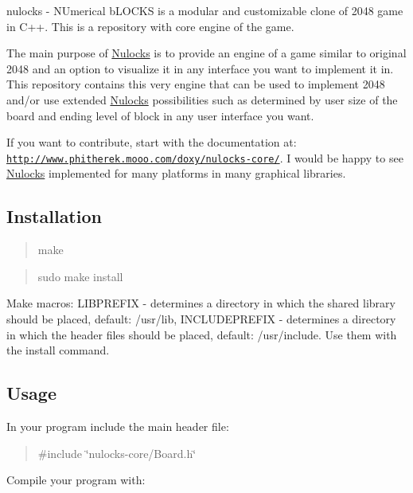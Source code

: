 nulocks -\/ N\-Umerical b\-L\-O\-C\-K\-S is a modular and customizable clone of 2048 game in C++. This is a repository with core engine of the game.

The main purpose of \hyperlink{namespace_nulocks}{Nulocks} is to provide an engine of a game similar to original 2048 and an option to visualize it in any interface you want to implement it in. This repository contains this very engine that can be used to implement 2048 and/or use extended \hyperlink{namespace_nulocks}{Nulocks} possibilities such as determined by user size of the board and ending level of block in any user interface you want.

If you want to contribute, start with the documentation at\-: \href{http://www.phitherek.mooo.com/doxy/nulocks-core/}{\tt http\-://www.\-phitherek.\-mooo.\-com/doxy/nulocks-\/core/}. I would be happy to see \hyperlink{namespace_nulocks}{Nulocks} implemented for many platforms in many graphical libraries.

\subsection*{Installation }

\begin{quotation}
make

\end{quotation}


\begin{quotation}
sudo make install

\end{quotation}


Make macros\-: L\-I\-B\-P\-R\-E\-F\-I\-X -\/ determines a directory in which the shared library should be placed, default\-: /usr/lib, I\-N\-C\-L\-U\-D\-E\-P\-R\-E\-F\-I\-X -\/ determines a directory in which the header files should be placed, default\-: /usr/include. Use them with the install command.

\subsection*{Usage }

In your program include the main header file\-:

\begin{quotation}
\#include \char`\"{}nulocks-\/core/\-Board.\-h\char`\"{}

\end{quotation}


Compile your program with\-:

